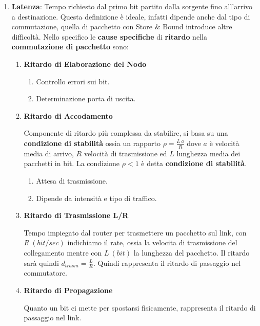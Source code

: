 \documentclass{article}
\begin{document}
\begin{enumerate}
    \item \textbf{Latenza}: Tempo richiesto dal primo bit partito dalla sorgente fino all'arrivo a destinazione. 
    Questa definizione è ideale, infatti dipende anche dal tipo di commutazione, quella di pacchetto con Store $\&$ Bound introduce altre difficoltà.
    Nello specifico le \textbf{cause specifiche} di \textbf{ritardo} nella \textbf{commutazione di pacchetto} sono:

    \begin{enumerate}
        \item \textbf{Ritardo di Elaborazione del Nodo}
        \begin{enumerate}
            \item Controllo errori sui bit.
            \item Determinazione porta di uscita.
        \end{enumerate}
        \item \textbf{Ritardo di Accodamento}
        
        Componente di ritardo più complessa da stabilire, si basa su una \textbf{condizione di stabilità} ossia un rapporto $\rho = \frac{L\:a}{R}$ dove $a$ è velocità
        media di arrivo, $R$ velocità di trasmissione ed $L$ lunghezza media dei pacchetti in bit.
        La condizione $\rho < 1$
        è detta \textbf{condizione di stabilità}.
        \begin{enumerate}
            \item Attesa di trasmissione.
            \item Dipende da intensità e tipo di traffico.
        \end{enumerate}
        \item \textbf{Ritardo di Trasmissione L/R}
        
        Tempo impiegato dal router per trasmettere un pacchetto sul link, con $R\:(bit/sec)$ indichiamo il rate, ossia la velocita di trasmissione del collegamento mentre con 
        $L \: (bit)$ la lunghezza del pacchetto. Il ritardo sarà quindi $d_{trasm} = \frac{L}{R}$. Quindi rappresenta il ritardo di passaggio nel commutatore.
        
        \item \textbf{Ritardo di Propagazione}
        
        Quanto un bit ci mette per spostarsi fisicamente, rappresenta il ritardo di passaggio nel link.
    \end{enumerate}


\end{enumerate}
\end{document}
